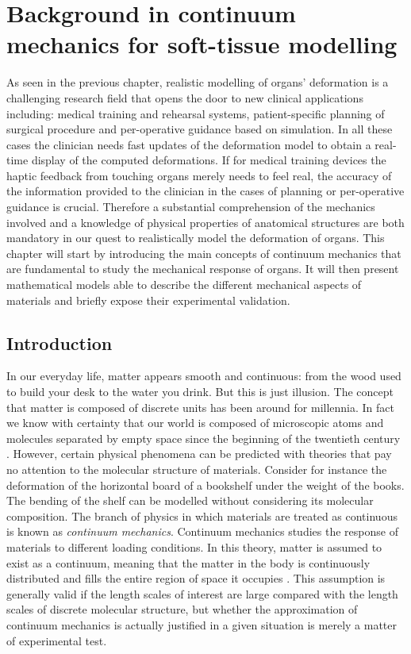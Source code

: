 \chapter{Background in continuum mechanics for soft-tissue modelling}
\label{chap:softtissue}
\begin{shortAbstract}
As seen in the previous chapter, realistic modelling of organs' deformation is a challenging research field that opens the door to new clinical applications including: medical training and rehearsal systems, patient-specific planning of surgical procedure and per-operative guidance based on simulation. In all these cases the clinician needs fast updates of the deformation model to obtain a real-time display of the computed deformations. If for medical training devices the haptic feedback from touching organs merely needs to feel real, the accuracy of the information provided to the clinician in the cases of planning or per-operative guidance is crucial. Therefore a substantial comprehension of the mechanics involved and a knowledge of physical properties of anatomical structures are both mandatory in our quest to realistically model the deformation of organs. This chapter will start by introducing the main concepts of continuum mechanics that are fundamental to study the mechanical response of organs. It will then present mathematical models able to describe the different mechanical aspects of materials and briefly expose their experimental validation.
\end{shortAbstract}



\section{Introduction}
In our everyday life, matter appears smooth and continuous: from the wood used to build your desk to the water you drink. But this is just illusion. The concept that matter is composed of discrete units has been around for millennia. In fact we know with certainty that our world is composed of microscopic atoms and molecules separated by empty space since the beginning of the twentieth century \citep{Lautrup05}. However, certain physical phenomena can be predicted with theories that pay no attention to the molecular structure of materials. Consider for instance the deformation of the horizontal board of a bookshelf under the weight of the books. The bending of the shelf can be modelled without considering its molecular composition. The branch of physics in which materials are treated as continuous is known as \emph{continuum mechanics}. Continuum mechanics studies the response of materials to different loading conditions. In this theory, matter is assumed to exist as a continuum, meaning that the matter in the body is continuously distributed and fills the entire region of space it occupies \citep{Lai96}. This assumption is generally valid if the length scales of interest are large compared with the length scales of discrete molecular structure, but whether the approximation of continuum mechanics is actually justified in a given situation is merely a matter of experimental test. 

